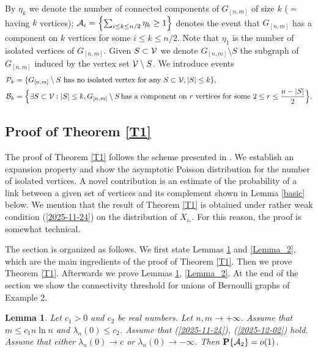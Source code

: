 \documentclass[11pt, a4paper]{article}
\newcommand{\PP}{{\bf{P}}}
\newtheorem{lem}{Lemma}
\begin{document}
By $\eta_k$ we denote the number of connected components 
of $G_{[n,m]}$ 
of size $k$ ($=$ having $k$ vertices);
${\cal A}_i=
\left\{\sum_{i\le k\le n/2}\eta_k\ge 1\right\}$
denotes the event that $G_{[n,m]}$ has a component on $k$ 
vertices for 
some $i\le k\le n/2$.
Note that $\eta_1$ is the number of isolated vertices 
of $G_{[n,m]}$.
Given $S\subset {\cal V}$ we denote $G_{[n,m]}\setminus S$ the subgraph of $G_{[n,m]}$ induced by the vertex set ${\cal V}\setminus S$.
We introduce events 
 \begin{align*}
 {\cal P}_k
 &
 =\{G_{[n,m]}\setminus S   {\text{ has no isolated vertex for any }} S\subset {\cal V}, 
 |S|\le k \},
 \\
 {\cal B}_k
 &
 =\Bigl\{ \exists  S\subset {\cal V}: |S|\le k, G_{[n,m]}\setminus S \,
{\text{has  a  component  on}}
\
r
\
{\text{vertices  for  some}}
\
2\le r\le \frac{n-|S|}{2}
\Bigr\}.
\end{align*}



\subsection{Proof of Theorem \ref{T1}}


The proof of Theorem \ref{T1} follows the scheme presented in \cite{FriezeKaronski}.
We 
establish an expansion property and show the asymptotic Poisson distribution for the number of isolated vertices.
 A novel contribution is  an estimate of the probability of a link between a given set of vertices and its complement 
 shown in Lemma \ref{basic} below.
 We mention that the result of Theorem \ref{T1}
 is obtained under rather weak condition (\ref{2025-11-24})
 on the distribution of $X_{i_*}$. 
For this reason, the proof is somewhat technical. 


The section is organized as follows. We first state Lemmas \ref{Lemma_1G} and \ref{Lemma_2}, which are the main ingredients of the proof of  Theorem \ref{T1}. Then we prove Theorem \ref{T1}. Afterwards we prove Lemmas \ref{Lemma_1G}, \ref{Lemma_2}. At the end of the section we show the
connectivity threshold for unions of Bernoulli 
graphs of Example 2.




\begin{lem}
\label{Lemma_1G} Let $c_1>0$ and $c_2$ be real numbers. 
Let $n,m\to+\infty$. Assume that $m\le c_1n\ln n$ and 
$\lambda_{n}(0)\le c_2$. Assume that (\ref{2025-11-24}),
(\ref{2025-12-02}) hold.   Assume that either 
$\lambda_{n}(0)\to c$ or $\lambda_{n}(0)\to-\infty$.
Then $\PP\{{\cal A}_2\}=o(1)$.
\end{lem}
\end{document}
